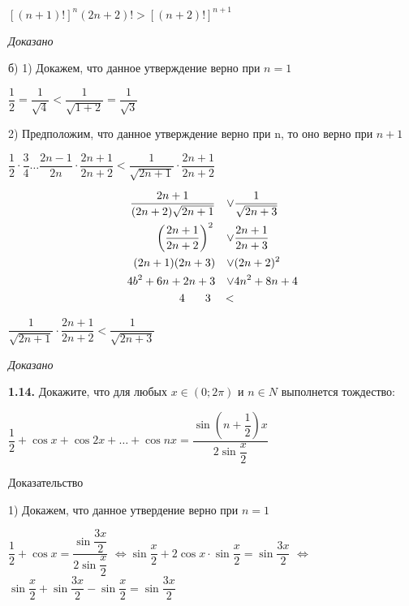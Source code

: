 \documentclass[12pt]{article}
\begin{document}
	\hspace{10mm}$
		[(n+1)!]^n(2n+2)! > [(n+2)!]^{n+1}
	$
	
	\medskip
	{\it Доказано}
	
	\medskip
	б) 1) Докажем, что данное утверждение  верно при $n=1$
	\vspace{2mm}
	
	\quad$
		\dfrac{1}{2} = \dfrac{1}{\sqrt{4}} < \dfrac{1}{\sqrt{1+2}} = \dfrac{1}{\sqrt{3}}
	$\vspace{2mm}
	
	2) Предположим, что данное утверждение верно при n, то оно верно при $n+1$\medskip
	
	\qquad$
	\dfrac{1}{2}\cdot\dfrac{3}{4}\dots\dfrac{2n-1}{2n}\cdot\dfrac{2n+1}{2n+2} < \dfrac{1}{\sqrt{2n+1}}\cdot\dfrac{2n+1}{2n+2}
	$
	
	\begin{eqnarray*}
		\dfrac{2n+1}{(2n+2)\sqrt{2n+1}}\quad \vee& \dfrac{1}{\sqrt{2n+3}} \\
		\left(\dfrac{2n+1}{2n+2}\right)^2\quad \vee& \dfrac{2n+1}{2n+3} \\
		(2n+1)(2n+3) \quad \vee& (2n+2)^2 \\
		4b^2+6n+2n+3 \quad \vee& 4n^2+8n +4 \\
		3 \quad <& \hspace{-17mm}4
	\end{eqnarray*}
	
	\qquad$
	\dfrac{1}{\sqrt{2n+1}}\cdot\dfrac{2n+1}{2n+2} < \dfrac{1}{\sqrt{2n+3}}
	$
	
	\medskip
	{\it Доказано}
	
	\medskip
	{\bf 1.14.} Докажите, что для любых $x\in(0;2\pi)$ и $n\in N$ выполнется тождество:
	
	\begin{center}
		$
			\dfrac{1}{2} + \cos x+\cos 2x +\dots+ \cos nx = \dfrac{\sin\left(n+\dfrac{1}{2}\right)x}{2\sin\dfrac{x}{2}}
		$
	\end{center}
	
	Доказательство
	
	\medskip
	
	1) Докажем, что данное утвердение верно при $n=1$
	\vspace{2mm}
	
	$
	\dfrac{1}{2}+\cos x = \dfrac{\sin\dfrac{3x}{2}}{2\sin\dfrac{x}{2}}
	$  \quad$\Longleftrightarrow$\quad $\sin\dfrac{x}{2} + 2\cos x\cdot\sin\dfrac{x}{2} = \sin\dfrac{3x}{2}$  \quad$\Longleftrightarrow$\quad $\sin\dfrac{x}{2} + \sin\dfrac{3x}{2} - \sin\dfrac{x}{2} = \sin\dfrac{3x}{2}$\medskip
	
\end{document}
